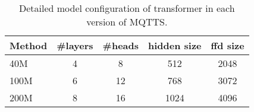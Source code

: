 \begin{table}[!tb]
    \centering
    \caption{Detailed model configuration of transformer in each version of MQTTS.}
    \label{tab:appendix:arc}
    \begin{tabular}{l|c|c|c|c}
        \toprule
        Method  & \#layers & \#heads & hidden size & ffd size\\
        \midrule
        40M & 4 & 8 & 512 & 2048 \\
        100M & 6 & 12 & 768 & 3072 \\
        200M & 8 & 16 & 1024 & 4096 \\
        \bottomrule
    \end{tabular}
\end{table}